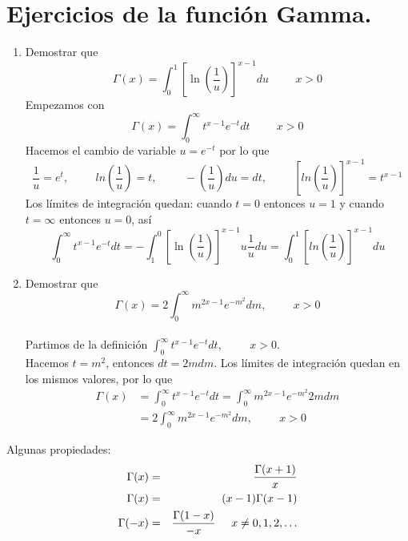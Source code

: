 \section{Ejercicios de la función Gamma.}
\begin{enumerate}
\item Demostrar que
\[ \Gamma(x) = \int_{0}^{1} \left[ \ln \left( \dfrac{1}{u} \right) \right]^{x-1} du \hspace{1cm} x>0 \]
Empezamos con
\[ \Gamma(x) = \int_{0}^{\infty} t^{x-1} e^{-t} dt \hspace{1cm} x>0 \]
Hacemos el cambio de variable $u = e^{-t}$ por lo que
\[ \dfrac{1}{u} = e^{t}, \hspace{1cm} ln \left(\dfrac{1}{u} \right) = t, \hspace{1cm} -\left(\dfrac{1}{u} \right) du = dt, \hspace{1cm} \left[ ln \left( \dfrac{1}{u} \right) \right]^{x-1} = t^{x-1} \]
Los límites de integración quedan: cuando $t=0$ entonces $u=1$ y cuando $t = \infty$ entonces $u=0$, así
\[ \int_{0}^{\infty} t^{x-1} e^{-t} dt = - \int_{1}^{0} \left[  \ln \left( \dfrac{1}{u} \right) \right]^{x-1} u \dfrac{1}{u} du = \int_{0}^{1} \left[ ln \left( \dfrac{1}{u} \right) \right]^{x-1} du  \]
\item Demostrar que 
 \[ \Gamma(x) = 2 \int_{0}^{\infty} m^{2x-1} e^{-m^{2}} dm, \hspace{1cm} x>0 \]
\\
Partimos de la definición $\int_{0}^{\infty} t^{x-1} e^{-t} dt, \hspace{1cm} x>0$.
\\
Hacemos $t=m^{2}$, entonces $dt= 2m dm$. Los límites de integración quedan en los mismos valores, por  lo que
\[ \begin{split}
\Gamma(x) &= \int_{0}^{\infty} t^{x-1} e^{-t} dt = \int_{0}^{\infty} m^{2x-1} e^{-m^{2}} 2m dm \\
 &= 2 \int_{0}^{\infty} m^{2x-1} e^{-m^{2}} dm, \hspace{1cm} x>0
\end{split}  \]
\end{enumerate}
Algunas propiedades:
\begin{eqnarray}
\Gamma (x) &=& \dfrac{\Gamma(x+1)}{x} \nonumber \\
\Gamma (x) &=& (x-1) \Gamma (x-1) \nonumber \\
\Gamma (-x) &=& \dfrac{\Gamma (1-x)}{-x} \hspace{0.5cm} x \neq 0,1,2, \ldots \nonumber 
\end{eqnarray}
